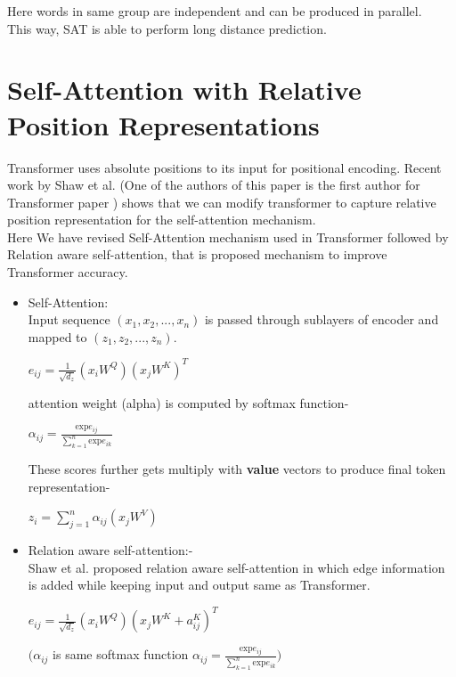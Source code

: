 \documentclass{article}
\DeclarePairedDelimiter\floor{\lfloor}{\rfloor}
\begin{document}
\begin{multicols}{2}
    \noindent {}
Here words in same group are independent and can be produced in parallel. \\
This way, SAT is able to perform long distance prediction.

\section{Self-Attention with Relative Position Representations}
Transformer uses absolute
positions to its input for positional encoding. Recent work by Shaw et al. \cite{shaw2018selfattention}(One of the authors of this paper is the first author for Transformer paper )  shows that we can modify transformer to capture relative position representation for the self-attention mechanism.
\\
Here We have revised Self-Attention mechanism used in Transformer followed by Relation aware self-attention, that is proposed mechanism to improve Transformer accuracy.
\begin{itemize}
    \item Self-Attention: \\
   Input sequence  $(x_1, x_2, ... , x_n)$ is passed through sublayers of encoder and mapped to  $(z_1, z_2, ... , z_n)$.
   \begin{center}
       $e_{ij} = \frac{1}{\sqrt{d_z}}(x_iW^Q)(x_jW^K)^T$
   \end{center}
   attention weight (alpha) is computed by softmax function-
    \begin{center}
      $\alpha _{ij} = \frac{\text{exp}e_{ij}}{\sum_{k=1}^{n} \text{exp}e_{ik}}$
   \end{center}
   These scores further gets multiply with \textbf{value} vectors to produce final token representation-
       \begin{center}
      $z_i = \sum_{j=1}^{n} \alpha _{ij}(x_jW^V)$
   \end{center}
   
   \item Relation aware self-attention:- \\
   Shaw et al. \cite{shaw2018selfattention} proposed relation aware self-attention in which edge information is added while keeping input and output same as Transformer.
    \begin{center}
       $e_{ij} = \frac{1}{\sqrt{d_z}}(x_iW^Q)(x_jW^K+a_{ij}^K)^T$
   \end{center}
  $\Big( \alpha _{ij}$ is same softmax function  $\alpha _{ij} = \frac{\text{exp}e_{ij}}{\sum_{k=1}^{n} \text{exp}e_{ik}}\Big)$ \\
  

\end{itemize}
\end{multicols}
\end{document}
